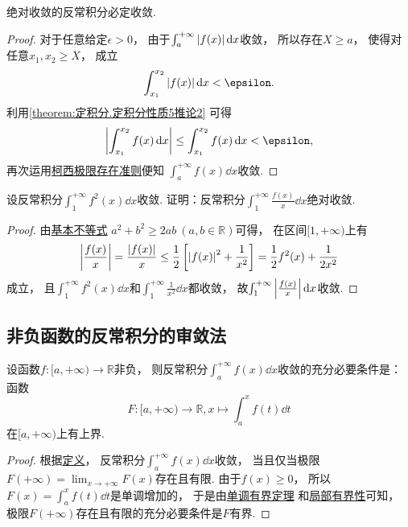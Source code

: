 \begin{theorem}\label{theorem:定积分.绝对收敛的无穷限反常积分必收敛}
绝对收敛的反常积分必定收敛.
\begin{proof}
对于任意给定\(\epsilon>0\)，
由于\(\int_a^{+\infty} \abs{f(x)} \dd{x}\)收敛，
所以存在\(X \geq a\)，
使得对任意\(x_1,x_2 \geq X\)，
成立\[
	\int_{x_1}^{x_2} \abs{f(x)} \dd{x} < \epsilon.
\]
利用\cref{theorem:定积分.定积分性质5推论2} 可得\[
	\abs{\int_{x_1}^{x_2} f(x) \dd{x}}
	\leq \int_{x_1}^{x_2} f(x) \dd{x}
	< \epsilon,
\]
再次运用\hyperref[theorem:反常积分.柯西极限存在准则]{柯西极限存在准则}便知
\(\int_a^{+\infty} f(x) \dd{x}\)收敛.
\end{proof}
\end{theorem}

\begin{example}
设反常积分\(\int_1^{+\infty} f^2(x) \dd{x}\)收敛.
证明：反常积分\(\int_1^{+\infty} \frac{f(x)}{x} \dd{x}\)绝对收敛.
\begin{proof}
由\hyperref[theorem:不等式.基本不等式2]{基本不等式}
\(a^2 + b^2 \geq 2ab\ (a,b\in\mathbb{R})\)可得，
在区间\([1,+\infty)\)上有\[
	\abs{\frac{f(x)}{x}}
	= \frac{\abs{f(x)}}{x}
	\leq \frac{1}{2} \left[
		\abs{f(x)}^2 + \frac{1}{x^2}
	\right]
	= \frac{1}{2} f^2(x) + \frac{1}{2x^2}
\]成立，
且\(\int_1^{+\infty} f^2(x) \dd{x}\)和\(\int_1^{+\infty} \frac{1}{x^2} \dd{x}\)都收敛，
故\(\int_1^{+\infty} \abs{\frac{f(x)}{x}} \dd{x}\)收敛.
\end{proof}
\end{example}

\subsection{非负函数的反常积分的审敛法}
\begin{theorem}\label{theorem:定积分.无穷限反常积分的审敛法引理}
设函数\(f\colon[a,+\infty)\to\mathbb{R}\)非负，
则反常积分\(\int_a^{+\infty} f(x) \dd{x}\)收敛的充分必要条件是：
函数\[
	F\colon[a,+\infty)\to\mathbb{R},
	x \mapsto \int_a^x f(t) \dd{t}
\]在\([a,+\infty)\)上有上界.
\begin{proof}
根据\hyperref[definition:定积分.无穷限的反常积分的定义1]{定义}，
反常积分\(\int_a^{+\infty} f(x) \dd{x}\)收敛，
当且仅当极限\(F(+\infty) = \lim_{x\to+\infty} F(x)\)存在且有限.
由于\(f(x)\geq0\)，
所以\(F(x) = \int_a^x f(t) \dd{t}\)是单调增加的，
于是由\hyperref[theorem:极限.函数的单调有界定理]{单调有界定理}%
和\hyperref[theorem:极限.函数极限的局部有界性]{局部有界性}可知，
极限\(F(+\infty)\)存在且有限的充分必要条件是\(F\)有界.
\end{proof}
\end{theorem}


